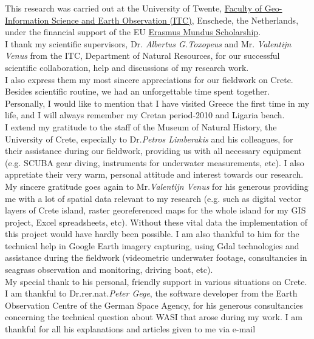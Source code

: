 \documentclass[10pt, a4paper]{article}
\begin{document}
This research was carried out at the University of Twente, \href{http://www.itc.nl/}{Faculty of Geo-Information Science and Earth Observation (ITC)}, Enschede, the Netherlands, under the financial support of the EU \href{http://ec.europa.eu/education/external-relation-programmes/doc72_en.htm}{Erasmus Mundus Scholarship}. 
\vspace{1mm}\\
I thank my scientific supervisors, Dr. \textit{Albertus G.Toxopeus}  and Mr. \textit{Valentijn Venus} from the ITC, Department of Natural Resources, for our successful scientific collaboration, help and discussions of my research work. \\
I also express them my most sincere appreciations for our fieldwork on Crete. \\ Besides scientific routine, we had an unforgettable time spent together. \\ Personally, I would like to mention that I have visited Greece the first time in my life, and I will always remember my Cretan period-2010 and Ligaria beach.\vspace{1mm}\\
I extend my gratitude to the staff of the Museum of Natural History, the University of Crete, especially to Dr.\textit{Petros Limberakis} and his colleagues, for their assistance during our fieldwork, providing us with all necessary equipment (e.g. SCUBA gear diving, instruments for underwater measurements, etc). I also appretiate their very warm, personal attitude and interest towards our research. 
\vspace{1mm}\\
My sincere gratitude goes again to Mr.\textit{Valentijn Venus} for his generous providing me with a lot of spatial data   relevant to my research (e.g. such as digital vector layers of Crete island, raster georeferenced maps for the whole island for my GIS project, Excel spreadsheets, etc). Without these vital data the implementation of this project would have hardly been possible. I am also thankful to him for the technical help in Google Earth imagery capturing, using Gdal technologies and assistance during the fieldwork (videometric underwater footage, consultancies in seagrass observation and monitoring, driving boat, etc). \\ My special thank to his personal, friendly support in various situations on Crete.\vspace{1mm}\\
I am thankful to Dr.rer.nat.\textit{Peter Gege}, the software developer from the Earth Observation Centre of the German Space Agency, for his generous consultancies concerning the technical question about WASI that arose during my work. I am thankful for all his explanations and articles given to me via e-mail \vspace{1mm}\\
\end{document}
